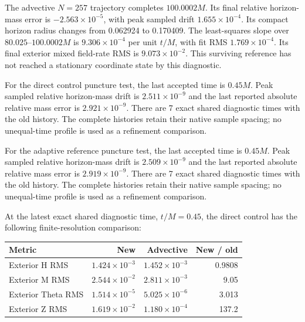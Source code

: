 The advective $N=257$ trajectory completes $100.0002M$. Its final relative horizon-mass error is $-2.563\times10^{-5}$, with peak sampled drift $1.655\times10^{-4}$. Its compact horizon radius changes from 0.062924 to 0.170409. The least-squares slope over $80.025$--$100.0002M$ is $9.306\times10^{-4}$ per unit $t/M$, with fit RMS $1.769\times10^{-4}$. Its final exterior mixed field-rate RMS is $9.073\times10^{-2}$. This surviving reference has not reached a stationary coordinate state by this diagnostic.

For the direct control puncture test, the last accepted time is $0.45M$. Peak sampled relative horizon-mass drift is $2.511\times10^{-9}$ and the last reported absolute relative mass error is $2.921\times10^{-9}$. There are 7 exact shared diagnostic times with the old history. The complete histories retain their native sample spacing; no unequal-time profile is used as a refinement comparison.

For the adaptive reference puncture test, the last accepted time is $0.45M$. Peak sampled relative horizon-mass drift is $2.509\times10^{-9}$ and the last reported absolute relative mass error is $2.919\times10^{-9}$. There are 7 exact shared diagnostic times with the old history. The complete histories retain their native sample spacing; no unequal-time profile is used as a refinement comparison.

At the latest exact shared diagnostic time, $t/M=0.45$, the direct control has the following finite-resolution comparison:

\begin{center}\small\begin{tabular}{lrrr}\toprule

Metric & New & Advective & New / old\\\midrule

Exterior H RMS & $1.424\times10^{-3}$ & $1.452\times10^{-3}$ & 0.9808\\

Exterior M RMS & $2.544\times10^{-2}$ & $2.811\times10^{-3}$ & 9.05\\

Exterior Theta RMS & $1.514\times10^{-5}$ & $5.025\times10^{-6}$ & 3.013\\

Exterior Z RMS & $1.619\times10^{-2}$ & $1.180\times10^{-4}$ & 137.2\\

\bottomrule\end{tabular}\end{center}

